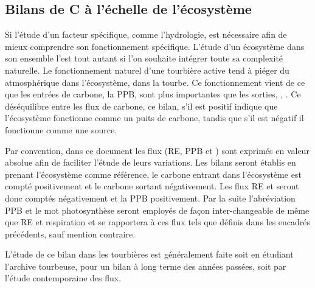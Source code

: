 \subsection{Bilans de C à l'échelle de l'écosystème}

Si l'étude d'un facteur spécifique, comme l'hydrologie, est nécessaire afin de mieux comprendre son fonctionnement spécifique.
L'étude d'un écosystème dans son ensemble l'est tout autant si l'on souhaite intégrer toute sa complexité naturelle.
Le fonctionnement naturel d'une tourbière active tend à piéger du \coo atmosphérique dans l'écosystème, dans la tourbe.
Ce fonctionnement vient de ce que les entrées de carbone, la PPB, sont plus importantes que les sorties, \coo, \chh.
Ce déséquilibre entre les flux de carbone, ce bilan, s'il est positif indique que l'écosystème fonctionne comme un puits de carbone, tandis que s'il est négatif il fonctionne comme une source.

Par convention, dans ce document les flux (RE, PPB et \fchh) sont exprimés en valeur absolue afin de faciliter l'étude de leurs variations.
Les bilans seront établis en prenant l'écosystème comme référence, le carbone entrant dans l'écosystème est compté positivement et le carbone sortant négativement.
Les flux RE et \fchh seront donc comptés négativement et la PPB positivement.
Par la suite l'abréviation PPB et le mot photosynthèse seront employés de façon inter-changeable de même que RE et respiration et se rapportera à ces flux tels que définis dans les encadrés précédents, sauf mention contraire.

L'étude de ce bilan dans les tourbières est généralement faite soit en étudiant l'archive tourbeuse, pour un bilan à long terme des années passées, soit par l'étude contemporaine des flux.


